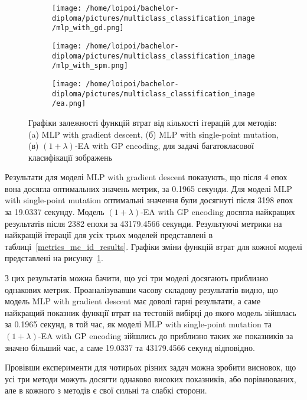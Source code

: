 \begin{figure}[ht]
	\centering
	\begin{subfigure}[b]{0.32\textwidth}    
		\texttt{[image: /home/loipoi/bachelor-diploma/pictures/multiclass\_classification\_image/mlp\_with\_gd.png]}
		\caption{}
	\end{subfigure}	
	\begin{subfigure}[b]{0.32\textwidth}
		\texttt{[image: /home/loipoi/bachelor-diploma/pictures/multiclass\_classification\_image/mlp\_with\_spm.png]}
		\caption{}
	\end{subfigure}	
	\begin{subfigure}[b]{0.32\textwidth}
		\texttt{[image: /home/loipoi/bachelor-diploma/pictures/multiclass\_classification\_image/ea.png]}
		\caption{}
	\end{subfigure}
	
	\caption{Графіки залежності функцій втрат від кількості ітерацій для методів: (a) MLP with gradient descent, (б) MLP with single-point mutation, (в) $(1+\lambda)$-EA with GP encoding, для задачі багатокласової класифікації зображень}
	\label{fig_losses_mc_id}
\end{figure}

Результати для моделі MLP with gradient descent показують, що після 4 епох вона досягла оптимальних значень метрик, за 0.1965 секунди. Для моделі MLP with single-point mutation оптимальні значення були досягнуті після 3198 епох за 19.0337 секунду. Модель $(1+\lambda)$-EA with GP encoding досягла найкращих результатів після 2382 епохи за 43179.4566 секунди. Результуючі метрики на найкращій ітерації для усіх трьох моделей представлені в таблиці~\ref{metrics_mc_id_results}. Графіки зміни функцій втрат для кожної моделі представлені на рисунку~\ref{fig_losses_mc_id}.

З цих результатів можна бачити, що усі три моделі досягають приблизно однакових метрик. Проаналізувавши часову складову результатів видно, що модель MLP with gradient descent має доволі гарні результати, а саме найкращий показник функції втрат на тестовій вибірці до якого модель зійшлась за 0.1965 секунд, в той час, як моделі MLP with single-point mutation та $(1+\lambda)$-EA with GP encoding зійшлись до приблизно таких же показників за значно більший час, а саме 19.0337 та 43179.4566 секунд відповідно.

Провівши експерименти для чотирьох різних задач можна зробити висновок, що усі три методи можуть досягти однаково високих показників, або порівнюваних, але в кожного з методів є свої сильні та слабкі сторони. 

